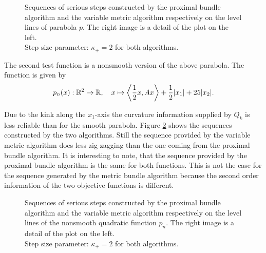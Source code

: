 \begin{figure}[H]
	\begin{subfigure}[t]{0.49\textwidth}
	\end{subfigure}
	\begin{subfigure}[t]{0.49\textwidth}
	\end{subfigure}
	\caption{Sequences of serious steps constructed by the proximal bundle algorithm and the variable metric algorithm respectively on the level lines of parabola \(p\). The right image is a detail of the plot on the left.\\
	Step size parameter: \(\kappa_+ = 2\) for both algorithms.}
	\label{fig_contour_parab}
\end{figure}

The second test function is a nonsmooth version of the above parabola. The function is given by 
\[ p_n(x): \mathbb{R}^2 \to \mathbb{R}, \quad x \mapsto \left\langle \frac{1}{2}x, Ax \right\rangle + \frac{1}{2}|x_1|+25|x_2|. \]

Due to the kink along the \(x_1\)-axis the curvature information supplied by \(Q_k\) is less reliable than for the smooth parabola.
Figure \ref{fig_contour_nonsm_parab} shows the sequences constructed by the two algorithms. Still the sequence provided by the variable metric algorithm does less zig-zagging than the one coming from the proximal bundle algorithm.
It is interesting to note, that the sequence provided by the proximal bundle algorithm is the same for both functions. This is not the case for the sequence generated by the metric bundle algorithm because the second order information of the two objective functions is different.

\begin{figure}[H]
	\begin{subfigure}[t]{0.49\textwidth}
	\end{subfigure}
	\begin{subfigure}[t]{0.49\textwidth}
	\end{subfigure}
	\caption{Sequences of serious steps constructed by the proximal bundle algorithm and the variable metric algorithm respectively on the level lines of the nonsmooth quadratic function \(p_n\). The right image is a detail of the plot on the left.\\
	Step size parameter: \(\kappa_+ = 2\) for both algorithms.}
	\label{fig_contour_nonsm_parab}
\end{figure}


